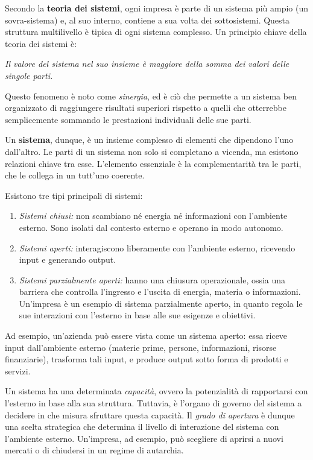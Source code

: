 \begin{redbar}
Secondo la \textbf{teoria dei sistemi}, ogni impresa è parte di un sistema più ampio (un sovra-sistema) e, al suo interno, contiene a sua volta dei sottosistemi. Questa struttura multilivello è tipica di ogni sistema complesso. Un principio chiave della teoria dei sistemi è:
\begin{center}
\begin{minipage}{0.9\textwidth}
\textit{Il valore del sistema nel suo insieme è maggiore della somma dei valori delle singole parti.}
\end{minipage}
\end{center}
\end{redbar}
Questo fenomeno è noto come \textit{sinergia}, ed è ciò che permette a un sistema ben organizzato di raggiungere risultati superiori rispetto a quelli che otterrebbe semplicemente sommando le prestazioni individuali delle sue parti.
\begin{redbar}
Un \textbf{sistema}, dunque, è un insieme complesso di elementi che dipendono l’uno dall’altro. Le parti di un sistema non solo si completano a vicenda, ma esistono relazioni chiave tra esse. L’elemento essenziale è la complementarità tra le parti, che le collega in un tutt'uno coerente.
\end{redbar}
Esistono tre tipi principali di sistemi:
\begin{enumerate}
    \item \textit{Sistemi chiusi:} non scambiano né energia né informazioni con l’ambiente esterno. Sono isolati dal contesto esterno e operano in modo autonomo.
    \item \textit{Sistemi aperti:} interagiscono liberamente con l’ambiente esterno, ricevendo input e generando output.
    \item \textit{Sistemi parzialmente aperti:} hanno una chiusura operazionale, ossia una barriera che controlla l’ingresso e l’uscita di energia, materia o informazioni. Un’impresa è un esempio di sistema parzialmente aperto, in quanto regola le sue interazioni con l’esterno in base alle sue esigenze e obiettivi.
\end{enumerate}
Ad esempio, un’azienda può essere vista come un sistema aperto: essa riceve input dall’ambiente esterno (materie prime, persone, informazioni, risorse finanziarie), trasforma tali input, e produce output sotto forma di prodotti e servizi.

Un sistema ha una determinata \textit{capacità}, ovvero la potenzialità di rapportarsi con l’esterno in base alla sua struttura. Tuttavia, è l’organo di governo del sistema a decidere in che misura sfruttare questa capacità. Il \textit{grado di apertura} è dunque una scelta strategica che determina il livello di interazione del sistema con l’ambiente esterno. Un’impresa, ad esempio, può scegliere di aprirsi a nuovi mercati o di chiudersi in un regime di autarchia.

